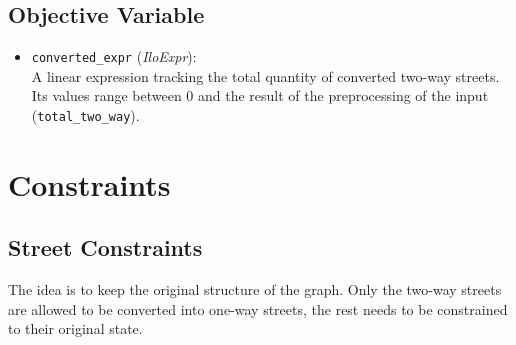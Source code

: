 \subsection*{Objective Variable}
\begin{itemize}
    \item \texttt{converted\_expr} (\textit{IloExpr}): \\
    A linear expression tracking the total quantity of converted two-way streets. Its values range between $0$ and the result of the preprocessing of the input (\texttt{total\_two\_way}).
\end{itemize}

\section*{Constraints}

\subsection*{Street Constraints}
The idea is to keep the original structure of the graph. Only the two-way streets are allowed to be converted into one-way streets, the rest needs to be constrained to their original state.

